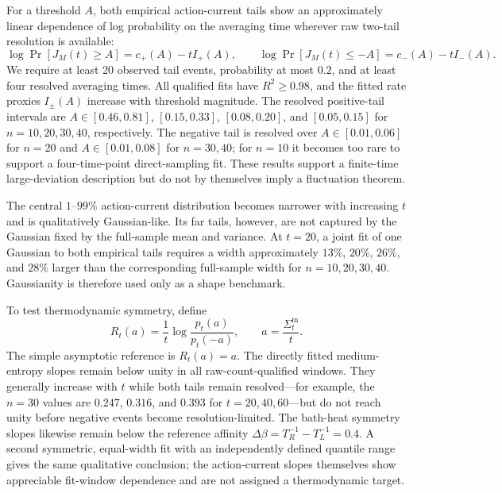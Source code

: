 For a threshold $A$, both empirical action-current tails show an approximately
linear dependence of log probability on the averaging time wherever raw
two-tail resolution is available:
\begin{equation}
  \log \Pr[J_M(t)\ge A]=c_+(A)-t I_+(A),\qquad
  \log \Pr[J_M(t)\le-A]=c_-(A)-t I_-(A).
  \label{eq:finite-time-rate-proxy}
\end{equation}
We require at least 20 observed tail events, probability at most $0.2$, and at
least four resolved averaging times.  All qualified fits have $R^2\ge0.98$,
and the fitted rate proxies $I_\pm(A)$ increase with threshold magnitude.  The
resolved positive-tail intervals are $A\in[0.46,0.81]$, $[0.15,0.33]$,
$[0.08,0.20]$, and $[0.05,0.15]$ for $n=10,20,30,40$, respectively.  The
negative tail is resolved over $A\in[0.01,0.06]$ for $n=20$ and
$A\in[0.01,0.08]$ for $n=30,40$; for $n=10$ it becomes too rare to support a
four-time-point direct-sampling fit.  These results support a finite-time
large-deviation description but do not by themselves imply a fluctuation
theorem.

The central $1$--$99\%$ action-current distribution becomes narrower with
increasing $t$ and is qualitatively Gaussian-like.  Its far tails, however,
are not captured by the Gaussian fixed by the full-sample mean and variance.
At $t=20$, a joint fit of one Gaussian to both empirical tails requires a width
approximately $13\%$, $20\%$, $26\%$, and $28\%$ larger than the corresponding
full-sample width for $n=10,20,30,40$.  Gaussianity is therefore used only as a
shape benchmark.

To test thermodynamic symmetry, define
\begin{equation}
  R_t(a)=\frac{1}{t}\log\frac{p_t(a)}{p_t(-a)},
  \qquad a=\frac{\Sigma_t^{\mathrm m}}{t}.
\end{equation}
The simple asymptotic reference is $R_t(a)=a$.  The directly fitted
medium-entropy slopes remain below unity in all raw-count-qualified windows.
They generally increase with $t$ while both tails remain resolved---for
example, the $n=30$ values are $0.247$, $0.316$, and $0.393$ for
$t=20,40,60$---but do not reach unity before negative events become
resolution-limited.  The bath-heat symmetry slopes likewise remain below the
reference affinity $\Delta\beta=T_R^{-1}-T_L^{-1}=0.4$.  A second symmetric,
equal-width fit with an independently defined quantile range gives the same
qualitative conclusion; the action-current slopes themselves show appreciable
fit-window dependence and are not assigned a thermodynamic target.

